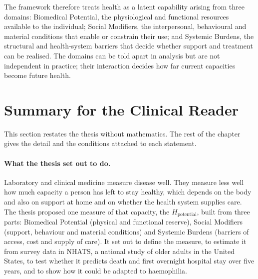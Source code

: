 The framework therefore treats health as a latent capability arising from three domains: Biomedical Potential, the physiological and functional resources available to the individual; Social Modifiers, the interpersonal, behavioural and material conditions that enable or constrain their use; and Systemic Burdens, the structural and health-system barriers that decide whether support and treatment can be realised. The domains can be told apart in analysis but are not independent in practice; their interaction decides how far current capacities become future health.

\section{Summary for the Clinical Reader}
\label{sec:conc-clinical}

\noindent This section restates the thesis without mathematics. The rest of the
chapter gives the detail and the conditions attached to each statement.

\paragraph{What the thesis set out to do.} Laboratory and clinical medicine
measure disease well. They measure less well how much capacity a person has left
to stay healthy, which depends on the body and also on support at home and on
whether the health system supplies care. The thesis proposed one measure of that
capacity, the $H_{\text{potential}}$, built from three parts: Biomedical
Potential (physical and functional reserve), Social Modifiers (support,
behaviour and material conditions) and Systemic Burdens (barriers of access,
cost and supply of care). It set out to define the measure, to estimate it from
survey data in NHATS, a national study of older adults in the United States, to
test whether it predicts death and first overnight hospital stay over five
years, and to show how it could be adapted to haemophilia.


